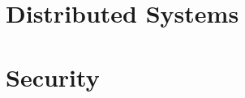 \documentclass[a4paper, 11pt]{report}
\begin{document}
\makedocumenttitlepage


\tableofcontents
\newpage

\part{Distributed Systems}














\part{Security}





\makedocumentbackpage
\end{document}
